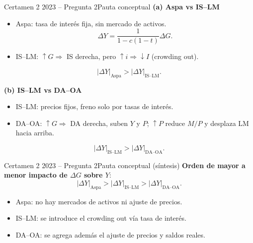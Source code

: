 \documentclass[aspectratio=169]{beamer}
\begin{document}
\begin{frame}{Certamen 2 2023 -- Pregunta 2}{Pauta conceptual}
\small
\textbf{(a) Aspa vs IS--LM}
\begin{itemize}
  \item Aspa: tasa de interés fija, sin mercado de activos.
  \[
  \Delta Y = \frac{1}{1 - c(1-t)}\Delta G.
  \]
  \item IS--LM: $\uparrow G \Rightarrow$ IS derecha, pero $\uparrow i \Rightarrow \downarrow I$ (crowding out).
\end{itemize}
\[
|\Delta Y|_{\text{Aspa}} > |\Delta Y|_{\text{IS--LM}}.
\]

\textbf{(b) IS--LM vs DA--OA}
\begin{itemize}
  \item IS--LM: precios fijos, freno solo por tasas de interés.
  \item DA--OA: $\uparrow G \Rightarrow$ DA derecha, suben $Y$ y $P$; $\uparrow P$ reduce $M/P$ y desplaza LM hacia arriba.
\end{itemize}
\[
|\Delta Y|_{\text{IS--LM}} > |\Delta Y|_{\text{DA--OA}}.
\]
\end{frame}

\begin{frame}{Certamen 2 2023 -- Pregunta 2}{Pauta conceptual (síntesis)}
\small
\textbf{Orden de mayor a menor impacto de $\Delta G$ sobre $Y$}:
\[
|\Delta Y|_{\text{Aspa}} > |\Delta Y|_{\text{IS--LM}} > |\Delta Y|_{\text{DA--OA}}.
\]

\begin{itemize}
  \item Aspa: no hay mercados de activos ni ajuste de precios.
  \item IS--LM: se introduce el crowding out vía tasa de interés.
  \item DA--OA: se agrega además el ajuste de precios y saldos reales.
\end{itemize}
\end{frame}
\end{document}
